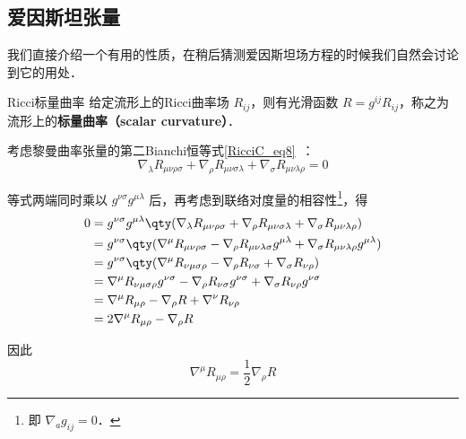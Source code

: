 

\subsection{爱因斯坦张量}

我们直接介绍一个有用的性质，在稍后猜测爱因斯坦场方程的时候我们自然会讨论到它的用处．

\begin{definition}{Ricci标量曲率}
给定流形上的Ricci曲率场 $R_{ij}$，则有光滑函数 $R=g^{ij}R_{ij}$，称之为流形上的\textbf{标量曲率（scalar curvature）}．
\end{definition}

考虑黎曼曲率张量的第二Bianchi恒等式\autoref{RicciC_eq8}~：
\begin{equation}
\nabla_\lambda R_{\mu\nu\rho\sigma}+\nabla_\rho R_{\mu\nu\sigma\lambda}+\nabla_\sigma R_{\mu\nu\lambda\rho}=0
\end{equation}

等式两端同时乘以 $g^{\nu\sigma}g^{\mu\lambda}$ 后，再考虑到联络对度量的相容性\footnote{即 $\nabla_ag_{ij}=0$．}，得
\begin{equation}
\begin{aligned}
0&=g^{\nu\sigma}g^{\mu\lambda}\qty(\nabla_\lambda R_{\mu\nu\rho\sigma}+\nabla_\rho R_{\mu\nu\sigma\lambda}+\nabla_\sigma R_{\mu\nu\lambda\rho})\\
&=g^{\nu\sigma}\qty(\nabla^\mu R_{\mu\nu\rho\sigma} - \nabla_\rho R_{\mu\nu\lambda\sigma}g^{\mu\lambda} + \nabla_\sigma R_{\mu\nu\lambda\rho}g^{\mu\lambda})\\
&=g^{\nu\sigma}\qty(\nabla^\mu R_{\nu\mu\sigma\rho} - \nabla_\rho R_{\nu\sigma} + \nabla_\sigma R_{\nu\rho})\\
&=\nabla^\mu R_{\nu\mu\sigma\rho}g^{\nu\sigma} - \nabla_\rho R_{\nu\sigma}g^{\nu\sigma} + \nabla_\sigma R_{\nu\rho}g^{\nu\sigma}\\
&=\nabla^\mu R_{\mu\rho} - \nabla_\rho R + \nabla^\nu R_{\nu\rho}\\
&=2\nabla^\mu R_{\mu\rho} - \nabla_\rho R
\end{aligned}
\end{equation}

因此
\begin{equation}\label{EinEqn_eq1}
\nabla^\mu R_{\mu\rho}=\frac{1}{2}\nabla_\rho R
\end{equation}


